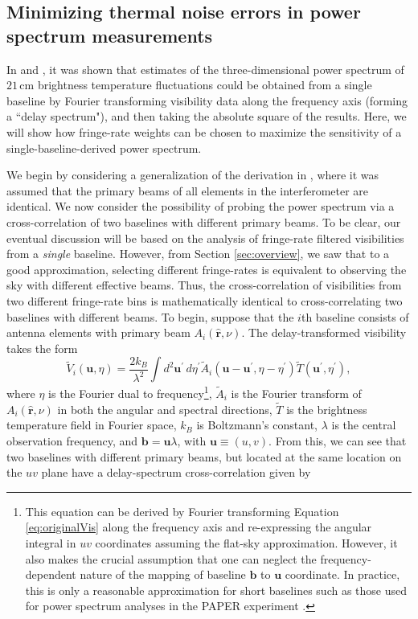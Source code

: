 \documentclass[twocolumn,apj,numberedappendix]{emulateapj}
\newcommand{\rhat}{\hat{\mathbf{r}}}
\begin{document}
\subsection{Minimizing thermal noise errors in power spectrum measurements}
\label{sec:PspecOptimization}

In \citet{parsons_et_al2012a} and \citet{P14}, it was shown that estimates of the three-dimensional power spectrum of $21\,\textrm{cm}$ brightness temperature fluctuations could be obtained from a single baseline by Fourier transforming visibility data along the frequency axis (forming a ``delay spectrum"), and then taking the absolute square of the results. Here, we will show how fringe-rate weights can be chosen to maximize the sensitivity of a single-baseline-derived power spectrum.

We begin by considering a generalization of the derivation in \citet{P14}, where it was assumed that the primary beams of all elements in the interferometer are identical. We now consider the possibility of probing the power spectrum via a cross-correlation of two baselines with different primary beams. To be clear, our eventual discussion will be based on the analysis of fringe-rate filtered visibilities from a \emph{single} baseline. However, from Section \ref{sec:overview}, we saw that to a good approximation, selecting different fringe-rates is equivalent to observing the sky with different effective beams. Thus, the cross-correlation of visibilities from two different fringe-rate bins is mathematically identical to cross-correlating two baselines with different beams. To begin, suppose that the $i$th baseline consists of antenna elements with primary beam $A_i (\rhat, \nu)$. The delay-transformed visibility takes the form
\begin{equation}
\widetilde{V}_i(\mathbf{u},\eta) = \frac{2 k_B}{\lambda^2} \int  d^2 \mathbf{u}^\prime \, d\eta^\prime \widetilde{A}_i (\mathbf{u} -\mathbf{u}^\prime, \eta-\eta^\prime) \widetilde{T}(\mathbf{u}^\prime , \eta^\prime),
\end{equation}
where $\eta$ is the Fourier dual to frequency\footnote{This equation can be derived by Fourier transforming Equation 
\eqref{eq:originalVis} along the frequency axis and re-expressing the angular integral in $uv$ coordinates assuming the flat-sky approximation. However, it also makes the crucial assumption that one can neglect the frequency-dependent nature of the mapping of baseline $\mathbf{b}$ to $\mathbf{u}$ coordinate. In practice, this is only a reasonable approximation for short baselines \citep{parsons_et_al2012b,liu_et_al2014a} such as those used for power spectrum analyses in the PAPER experiment \citep{P14,J14,ali_et_al2015}.
}, $\widetilde{A}_i $ is the Fourier transform of $A_i (\rhat, \nu)$ in both the angular and spectral directions, $\widetilde{T}$ is the brightness temperature field in Fourier space, $k_B$ is Boltzmann's constant, $\lambda$ is the central observation frequency, and $\mathbf{b} = \mathbf{u} \lambda$, with $\mathbf{u} \equiv (u,v)$. From this, we can see that two baselines with different primary beams, but located at the same location on the $uv$ plane have a delay-spectrum cross-correlation given by
\end{document}
